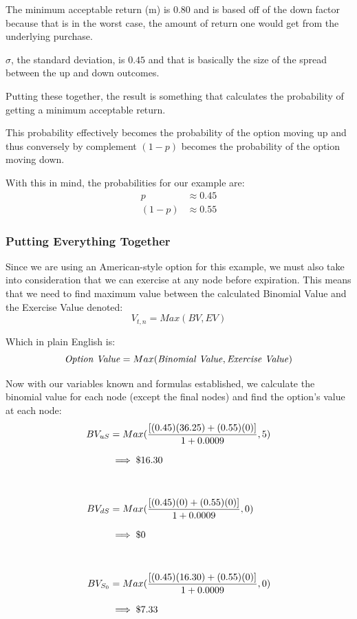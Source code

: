 \documentclass[12pt, letterpaper]{article}\usepackage{float}
\begin{document}
The minimum acceptable return (m) is ${0.80}$ and is based off of the down factor because that is in the worst case, the amount of return one would get from the underlying purchase.

${\sigma}$, the standard deviation, is ${0.45}$ and that is basically the size of the spread between the up and down outcomes.

Putting these together, the result is something that calculates the probability of getting a minimum acceptable return. %

This probability effectively becomes the probability of the option moving up and thus conversely by complement ${(1-p)}$ becomes the probability of the option moving down.

With this in mind, the probabilities for our example are:
\begin{align*}
  p
  & \approx 0.45
  \\
  (1-p)
  & \approx 0.55
\end{align*}


\subsubsection*{Putting Everything Together}
Since we are using an American-style option for this example, we must also take into consideration that we can exercise at any node before expiration.
This means that we need to find maximum value between the calculated Binomial Value and the Exercise Value denoted:
\begin{equation*}
  V_{t,n} = Max({BV, EV})
\end{equation*}

Which in plain English is:
\begin{equation*}
  \textrm{\textit{Option Value}} = Max(\textrm{\textit{Binomial Value}}, \textrm{\textit{Exercise Value}})
\end{equation*}


Now with our variables known and formulas established, we calculate the binomial value for each node (except the final nodes) and find the option's value at each node:
\begin{equation*}
  \setlength{\jot}{10pt}
  \begin{split}
    BV_{uS}
    & = Max(\frac{[(0.45)(36.25) + (0.55)(0)]}{1+0.0009}, 5)
    \\
    & \implies \$16.30
    \\
    \\
    BV_{dS}
    & = Max(\frac{[(0.45)(0) + (0.55)(0)]}{1+0.0009}, 0)
    \\
    & \implies \$0
    \\
    \\
    BV_{S_0}
    & = Max(\frac{[(0.45)(16.30) + (0.55)(0)]}{1+0.0009}, 0)
    \\
    & \implies \$7.33
  \end{split}
\end{equation*}
\end{document}
